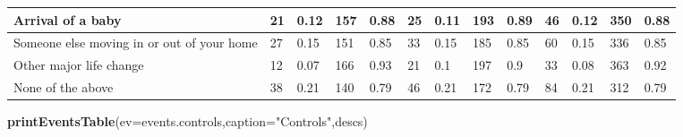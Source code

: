 \documentclass[]{article}
\newenvironment{Shaded}{\begin{snugshade}}{\end{snugshade}}
\newcommand{\DataTypeTok}[1]{\textcolor[rgb]{0.13,0.29,0.53}{#1}}
\newcommand{\KeywordTok}[1]{\textcolor[rgb]{0.13,0.29,0.53}{\textbf{#1}}}
\newcommand{\NormalTok}[1]{#1}
\newcommand{\StringTok}[1]{\textcolor[rgb]{0.31,0.60,0.02}{#1}}
\begin{document}
\begin{table}[t]
\begin{tabular}{l|l|l|l|l|l|l|l|l|l|l|l|l}
\hline
Arrival of a baby & 21 & 0.12 & 157 & 0.88 & 25 & 0.11 & 193 & 0.89 & 46 & 0.12 & 350 & 0.88\\
\hline
Someone else moving in or out of your home & 27 & 0.15 & 151 & 0.85 & 33 & 0.15 & 185 & 0.85 & 60 & 0.15 & 336 & 0.85\\
\hline
Other major life change & 12 & 0.07 & 166 & 0.93 & 21 & 0.1 & 197 & 0.9 & 33 & 0.08 & 363 & 0.92\\
\hline
None of the above & 38 & 0.21 & 140 & 0.79 & 46 & 0.21 & 172 & 0.79 & 84 & 0.21 & 312 & 0.79\\
\hline
\end{tabular}
\end{table}

\begin{Shaded}
\begin{Highlighting}[]
\KeywordTok{printEventsTable}\NormalTok{(}\DataTypeTok{ev=}\NormalTok{events.controls,}\DataTypeTok{caption=}\StringTok{"Controls"}\NormalTok{,descs)}
\end{Highlighting}
\end{Shaded}
\end{document}
